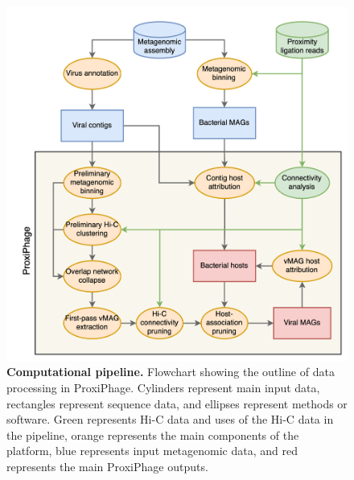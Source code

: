  \begin{figure}[!t]
    \centering
    \includegraphics[width=1\linewidth]{Figures/figure_proxiphage_flowchart.png}
    \caption{\textbf{Computational pipeline.} Flowchart showing the outline of data processing in ProxiPhage. Cylinders represent main input data, rectangles represent sequence data, and ellipses represent methods or software. Green represents Hi-C data and uses of the Hi-C data in the pipeline, orange represents the main components of the platform, blue represents input metagenomic data, and red represents the main ProxiPhage outputs.}
    \label{fig:figure_proxiphage_flowchart}
 \end{figure}
 

